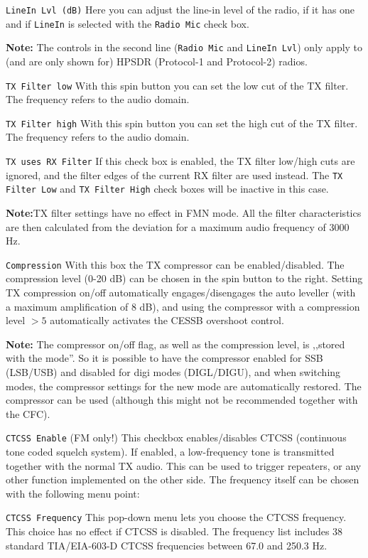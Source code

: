 \documentclass[12pt]{book}
\def\rett#1{\texttt{\color{red}#1}}
\begin{document}
\rett{LineIn Lvl (dB)} Here you can adjust the line-in level of the radio, if it
has one and if \rett{LineIn} is selected with the \rett{Radio Mic} check box.

\textbf{Note:} The controls in the second line (\rett{Radio Mic} and \rett{LineIn Lvl}) only
apply to (and are only
shown for) HPSDR (Protocol-1 and Protocol-2) radios.

\rett{TX Filter low} With this spin button you can set the low cut of the TX filter. The
frequency refers to the audio domain.

\rett{TX Filter high} With this spin button you can set the high cut of the TX filter. The
frequency refers to the audio domain.

\rett{TX uses RX Filter} If this check box is enabled, the TX filter low/high cuts are ignored,
and the filter edges of the current RX filter are used instead. The \rett{TX Filter Low}
and \rett{TX Filter High} check boxes will be inactive in this case.

\textbf{Note:}TX filter settings have no effect in FMN mode.
All the filter characteristics are then calculated from the deviation for
a maximum audio frequency of 3000 Hz.

\rett{Compression} With this box the TX compressor can be enabled/disabled.
The compression level (0-20 dB) can be chosen in the spin button to the right.
Setting TX compression on/off automatically engages/disengages the auto leveller
(with a maximum amplification of 8 dB), and using the compressor with a compression
level $> 5$  automatically activates the CESSB overshoot control.

\textbf{Note:} The compressor on/off flag, as well as the compression level, is
,,stored with the mode''. So it is possible to have the compressor enabled for SSB
(LSB/USB)
and disabled for digi modes (DIGL/DIGU), and when switching modes, the compressor
settings for the new mode are automatically restored. The compressor can be used (although
this might not be recommended together with the CFC).

\rett{CTCSS Enable} (FM only!) This checkbox enables/disables CTCSS (continuous tone coded squelch system).
If enabled, a low-frequency
tone is transmitted together with the normal TX audio. This can be used to trigger repeaters, or any other
function implemented
on the other side. The frequency itself can be chosen with the following menu point:

\rett{CTCSS Frequency} This pop-down menu lets you choose the CTCSS frequency. This choice has no effect if
CTCSS is disabled.
The frequency list includes 38 standard TIA/EIA-603-D CTCSS frequencies between 67.0 and 250.3 Hz.
\end{document}
